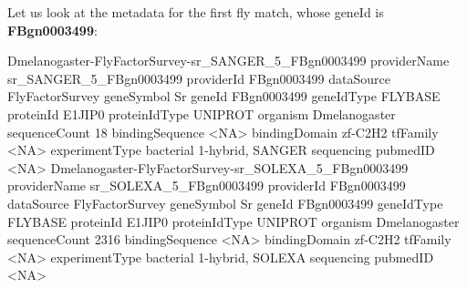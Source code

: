 \documentclass{article}
\renewenvironment{Schunk}{\vspace{\topsep}}{\vspace{\topsep}}
\begin{document}
Let us look at the metadata for the first fly match, whose geneId is \textbf{FBgn0003499}:
\begin{Schunk}
\begin{Soutput}
                Dmelanogaster-FlyFactorSurvey-sr_SANGER_5_FBgn0003499
providerName    sr_SANGER_5_FBgn0003499                              
providerId      FBgn0003499                                          
dataSource      FlyFactorSurvey                                      
geneSymbol      Sr                                                   
geneId          FBgn0003499                                          
geneIdType      FLYBASE                                              
proteinId       E1JIP0                                               
proteinIdType   UNIPROT                                              
organism        Dmelanogaster                                        
sequenceCount     18                                                 
bindingSequence <NA>                                                 
bindingDomain   zf-C2H2                                              
tfFamily        <NA>                                                 
experimentType  bacterial 1-hybrid, SANGER sequencing                
pubmedID        <NA>                                                 
                Dmelanogaster-FlyFactorSurvey-sr_SOLEXA_5_FBgn0003499
providerName    sr_SOLEXA_5_FBgn0003499                              
providerId      FBgn0003499                                          
dataSource      FlyFactorSurvey                                      
geneSymbol      Sr                                                   
geneId          FBgn0003499                                          
geneIdType      FLYBASE                                              
proteinId       E1JIP0                                               
proteinIdType   UNIPROT                                              
organism        Dmelanogaster                                        
sequenceCount   2316                                                 
bindingSequence <NA>                                                 
bindingDomain   zf-C2H2                                              
tfFamily        <NA>                                                 
experimentType  bacterial 1-hybrid, SOLEXA sequencing                
pubmedID        <NA>                                                 
\end{Soutput}
\end{Schunk}
\end{document}
